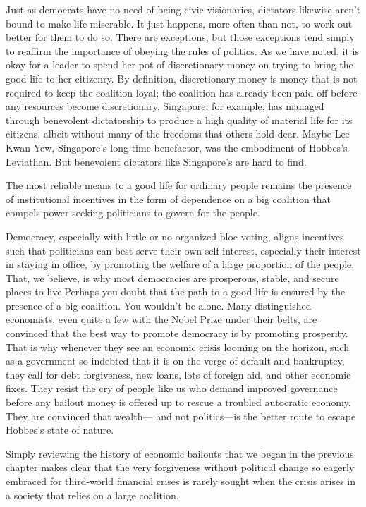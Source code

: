 \documentclass[10pt]{article}
\begin{document}
{\large Just as democrats have no need of being civic visionaries, dictators
likewise aren't bound to make life miserable. It just happens, more often than
not, to work out better for them to do so. There are exceptions, but those
exceptions tend simply to reaffirm the importance of obeying the rules of
politics. As we have noted, it is okay for a leader to spend her pot of
discretionary money on trying to bring the good life to her citizenry. By
definition, discretionary money is money that is not required to keep the
coalition loyal; the coalition has already been paid off before any resources
become discretionary. Singapore, for example, has managed through benevolent
dictatorship to produce a high quality of material life for its citizens, albeit
without many of the freedoms that others hold dear. Maybe Lee Kwan Yew,
Singapore's long-time benefactor, was the embodiment of Hobbes's Leviathan. But
benevolent dictators like Singapore's are hard to find.}

{\large The most reliable means to a good life for ordinary people remains the
presence of institutional incentives in the form of dependence on a big coalition
that compels power-seeking politicians to govern for the people.}

{\large Democracy, especially with little or no organized bloc voting, aligns
incentives such that politicians can best serve their own self-interest,
especially their interest in staying in office, by promoting the welfare of a
large proportion of the people. That, we believe, is why most democracies are
prosperous, stable, and secure places to live.Perhaps you doubt that the path to
a good life is ensured by the presence of a big coalition. You wouldn't be alone.
Many distinguished economists, even quite a few with the Nobel Prize under their
belts, are convinced that the best way to promote democracy is by promoting
prosperity. That is why whenever they see an economic crisis looming on the
horizon, such as a government so indebted that it is on the verge of default and
bankruptcy, they call for debt forgiveness, new loans, lots of foreign aid, and
other economic fixes. They resist the cry of people like us who demand improved
governance before any bailout money is offered up to rescue a troubled autocratic
economy. They are convinced that wealth--- and not politics---is the better route
to escape Hobbes's state of nature.}

{\large Simply reviewing the history of economic bailouts that we began in the
previous chapter makes clear that the very forgiveness without political change
so eagerly embraced for third-world financial crises is rarely sought when the
crisis arises in a society that relies on a large coalition.}
\end{document}
